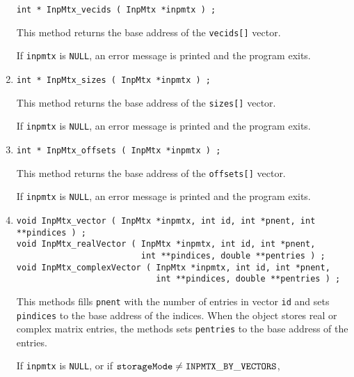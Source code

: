 \begin{enumerate}
\begin{verbatim}
int * InpMtx_vecids ( InpMtx *inpmtx ) ;
\end{verbatim}
This method returns the base address of the {\tt vecids[]} vector.
\par {}
If {\tt inpmtx} is {\tt NULL},
an error message is printed and the program exits.
\item
\begin{verbatim}
int * InpMtx_sizes ( InpMtx *inpmtx ) ;
\end{verbatim}
This method returns the base address of the {\tt sizes[]} vector.
\par {}
If {\tt inpmtx} is {\tt NULL},
an error message is printed and the program exits.
\item
\begin{verbatim}
int * InpMtx_offsets ( InpMtx *inpmtx ) ;
\end{verbatim}
This method returns the base address of the {\tt offsets[]} vector.
\par {}
If {\tt inpmtx} is {\tt NULL},
an error message is printed and the program exits.
\item
\begin{verbatim}
void InpMtx_vector ( InpMtx *inpmtx, int id, int *pnent, int **pindices ) ;
void InpMtx_realVector ( InpMtx *inpmtx, int id, int *pnent, 
                         int **pindices, double **pentries ) ;
void InpMtx_complexVector ( InpMtx *inpmtx, int id, int *pnent, 
                            int **pindices, double **pentries ) ;
\end{verbatim}
This methods fills {\tt *pnent} with the number of entries in
vector {\tt id} and 
sets {\tt *pindices} to the base address of the indices.
When the object stores real or complex matrix entries,
the methods sets {\tt *pentries} to the base address of the entries.
\par {}
If {\tt inpmtx} is {\tt NULL},
or if ${\tt storageMode} \ne {\tt INPMTX\_BY\_VECTORS}$,

\end{enumerate}
